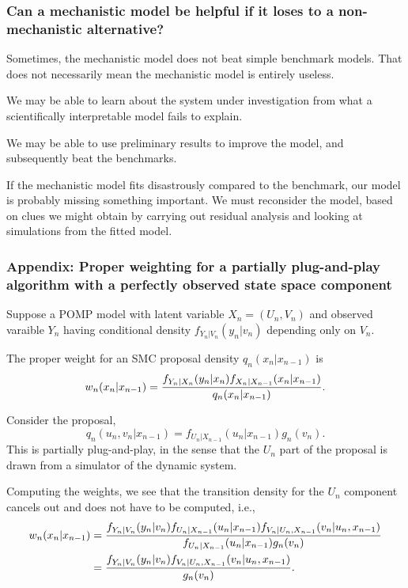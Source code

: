 \documentclass{beamer}\usepackage[]{graphicx}\usepackage[]{color}
\begin{document}
\begin{frame}[fragile]

\frametitle{Can a mechanistic model be helpful if it loses to a non-mechanistic alternative?}

\bi

\item Sometimes, the mechanistic model does not beat simple benchmark models. That does not necessarily mean the mechanistic model is entirely useless. 

\item We may be able to learn about the system under investigation from what a scientifically interpretable model fails to explain.

\item We may be able to use preliminary results to improve the model, and subsequently beat the benchmarks.

\item If the mechanistic model fits disastrously compared to the benchmark, our model is probably missing something important. We must reconsider the model, based on clues we might obtain by carrying out residual analysis and looking at simulations from the fitted model.

\ei

\end{frame}

\begin{frame}[fragile]

\frametitle{Appendix: Proper weighting for a partially plug-and-play algorithm with a perfectly observed state space component}

\bi

\item Suppose a POMP model with latent variable $X_n=(U_n,V_n)$ and observed varaible $Y_n$ having conditional density $f_{Y_n|V_n}(y_n|v_n)$ depending only on $V_n$. 

\item The proper weight \citep{liu98} for an SMC proposal density $q_n(x_n|x_{n-1})$ is
$$ 
w_{n}(x_n|x_{n-1}) = \frac{f_{Y_n|X_n}(y_n|x_n)f_{X_n|X_{n-1}}(x_n|x_{n-1})}{q_n(x_n|x_{n-1})}.
$$

\item Consider the  proposal,
$$
q_n(u_n,v_n|x_{n-1}) = f_{U_n|X_{n-1}}(u_n|x_{n-1}) g_n(v_n).
$$
This is partially plug-and-play, in the sense that the $U_n$ part of the proposal is drawn from a simulator of the dynamic system. 

\item Computing the weights, we see that the transition density for the $U_n$ component cancels out and does not have to be computed, i.e., 
$$\begin{aligned}
w_{n}(x_n|x_{n-1}) &= \frac{f_{Y_n|V_n}(y_n|v_n)f_{U_n|X_{n-1}}(u_n|x_{n-1})f_{V_n|U_n,X_{n-1}}(v_n|u_n,x_{n-1})}{f_{U_n|X_{n-1}}(u_n|x_{n-1}) g_n(v_n)} \\
&= \frac{f_{Y_n|V_n}(y_n|v_n)f_{V_n|U_n,X_{n-1}}(v_n|u_n,x_{n-1})}{ g_n(v_n)}.
\end{aligned} 
$$

\ei

\end{frame}
\end{document}

